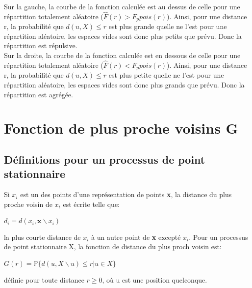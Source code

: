 \documentclass[french,12pt,a4paper]{report}
\begin{document}
Sur la gauche, la courbe de la fonction calculée est au dessus de celle pour une répartition totalement aléatoire (\begin{math}\hat{F}(r) > F_p{pois}(r) \end{math}). Ainsi, pour une distance r, la probabilité que \begin{math} d(u,X) \leq r \end{math} est plus grande quelle ne l'est pour une répartition aléatoire, les espaces vides sont donc plus petits que prévu. Donc la répartition est répulsive.\\
\indent
Sur la droite, la courbe de la fonction calculée est en dessous de celle pour une répartition totalement aléatoire (\begin{math}\hat{F}(r) < F_p{pois}(r) \end{math}). Ainsi, pour une distance r, la probabilité que \begin{math} d(u,X) \leq r \end{math} est plus petite quelle ne l'est pour une répartition aléatoire, les espaces vides sont donc plus grands que prévu. Donc la répartition est agrégée.


\section{Fonction de plus proche voisins G}

\subsection{Définitions pour un processus de point stationnaire}
Si \begin{math}x_i\end{math} est un des points d'une représentation de points \textbf{x}, la distance du plus proche voisin de  \begin{math}x_i\end{math} est écrite telle que:
\begin{center}\begin{math} d_i = d(x_i,\textbf{x}\backslash x_i ) \end{math}\end{center}
la plus courte distance de \begin{math} x_i \end{math} à un autre point de \textbf{x} excepté \begin{math} x_i \end{math}.
Pour un processus de point stationnaire X, la fonction de distance du plus proch voisin est:
\begin{center}\begin{math} G(r) = \mathbb{P}\{ d(u,X\backslash u) \leq r | u \in X\} \end{math}\end{center}
définie pour toute distance \begin{math} r \geq 0 \end{math}, où u est une position quelconque.\\
\end{document}
